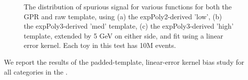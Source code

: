 \begin{figure} 
\begin{center}

\caption{The distribution of spurious signal for various functions for both the GPR and raw template, using (a) the expPoly2-derived 'low', (b) the expPoly3-derived 'med' template, (c) the expPoly3-derived 'high' template, extended by 5 GeV on either side, and fit using a linear error kernel. Each toy in this test has 10M events.}
\label{fig:linearkernel_lowpt_10M_noSig}
\end{center}
\end{figure}

We report the results of the padded-template, linear-error kernel bias study for all categories in the \Tab{\ref{tab:NoSigSSlinear}}. 

